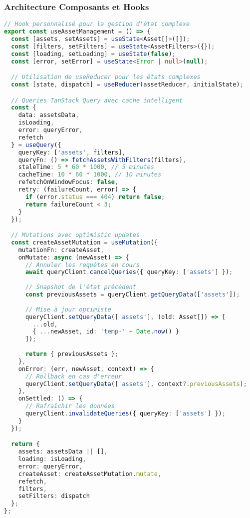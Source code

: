 \documentclass[12pt,a4paper]{report}
\begin{document}
\subsubsection{Architecture Composants et Hooks}

\begin{lstlisting}[language=TypeScript, caption=Architecture de composants avancée]
// Hook personnalisé pour la gestion d'état complexe
export const useAssetManagement = () => {
  const [assets, setAssets] = useState<Asset[]>([]);
  const [filters, setFilters] = useState<AssetFilters>({});
  const [loading, setLoading] = useState(false);
  const [error, setError] = useState<Error | null>(null);

  // Utilisation de useReducer pour les états complexes
  const [state, dispatch] = useReducer(assetReducer, initialState);

  // Queries TanStack Query avec cache intelligent
  const {
    data: assetsData,
    isLoading,
    error: queryError,
    refetch
  } = useQuery({
    queryKey: ['assets', filters],
    queryFn: () => fetchAssetsWithFilters(filters),
    staleTime: 5 * 60 * 1000, // 5 minutes
    cacheTime: 10 * 60 * 1000, // 10 minutes
    refetchOnWindowFocus: false,
    retry: (failureCount, error) => {
      if (error.status === 404) return false;
      return failureCount < 3;
    }
  });

  // Mutations avec optimistic updates
  const createAssetMutation = useMutation({
    mutationFn: createAsset,
    onMutate: async (newAsset) => {
      // Annuler les requêtes en cours
      await queryClient.cancelQueries({ queryKey: ['assets'] });
      
      // Snapshot de l'état précédent
      const previousAssets = queryClient.getQueryData(['assets']);
      
      // Mise à jour optimiste
      queryClient.setQueryData(['assets'], (old: Asset[]) => [
        ...old,
        { ...newAsset, id: 'temp-' + Date.now() }
      ]);
      
      return { previousAssets };
    },
    onError: (err, newAsset, context) => {
      // Rollback en cas d'erreur
      queryClient.setQueryData(['assets'], context?.previousAssets);
    },
    onSettled: () => {
      // Rafraîchir les données
      queryClient.invalidateQueries({ queryKey: ['assets'] });
    }
  });

  return {
    assets: assetsData || [],
    loading: isLoading,
    error: queryError,
    createAsset: createAssetMutation.mutate,
    refetch,
    filters,
    setFilters: dispatch
  };
};


\end{lstlisting}
\end{document}
